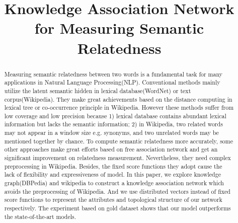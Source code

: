\documentclass[letterpaper]{article} %
\begin{document}
%
\title{Knowledge Association Network for Measuring Semantic Relatedness}
\author{
}
\maketitle              %
  \begin{abstract}
    Measuring semantic relatedness between two words is a fundamental task for many applications in Natural Language
    Processing(NLP). Conventional methods mainly utilize the latent semantic hidden in lexical database(WordNet) or text corpus(Wikipedia).
    They make great achievements based on the distance computing in lexical tree or co-occurrence principle in Wikipedia.
    However these methods suffer from low coverage and low precision because
    1) lexical database contains abundant lexical information but lacks the semantic information;
    2) in Wikipedia, two related words may not appear in a window size e.g. synonyms, and two unrelated words may 
    be mentioned together by chance. To compute semantic relatedness more accurately, some other approaches make great efforts
    based on free association network and get an significant improvement on relatedness measurement. Nevertheless,
    they need complex preprocessing in Wikipedia. Besides, the fixed score functions they adopt cause the lack of
    flexibility and expressiveness of model. 
    In this paper, we explore knowledge graph(DBPedia) and wikipedia to construct a knowledge association network which avoids the
    preprocessing of Wikipedia. And we use distributed vectors instead of fixed score functions to represent the attributes
    and topological structure of our network respectively. The experiment based on gold dataset shows that our model outperforms
    the state-of-the-art models.


  \end{abstract}

  
  
  
  
  
  
  
  
  
\end{document}
